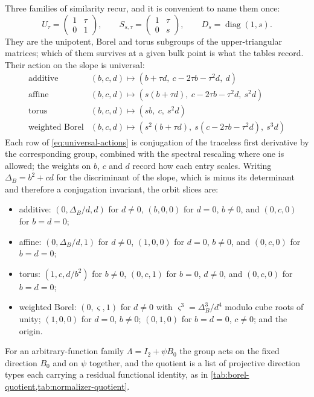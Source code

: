 \documentclass[11pt,reqno]{amsart}
\theoremstyle{plain}
\theoremstyle{definition}
\theoremstyle{remark}
\numberwithin{equation}{section}
\providecommand{\diag}{\operatorname{diag}}
\newcommand{\Id}{I_2}
\begin{document}
Three families of similarity recur, and it is convenient to name them once:
\begin{equation}
U_\tau=\begin{pmatrix}1&\tau\\0&1\end{pmatrix},\qquad
S_{s,\tau}=\begin{pmatrix}1&\tau\\0&s\end{pmatrix},\qquad
D_s=\diag(1,s).
\label{eq:quotient-groups}
\end{equation}
They are the unipotent, Borel and torus subgroups of the upper-triangular
matrices; which of them survives at a given bulk point is what the tables record.
Their action on the slope is universal:
\begin{equation}
\begin{array}{c|c}
\text{additive}&(b,c,d)\mapsto(b+\tau d,\ c-2\tau b-\tau^2d,\ d)\\[1mm]
\text{affine}&(b,c,d)\mapsto(s(b+\tau d),\ c-2\tau b-\tau^2d,\ s^2d)\\[1mm]
\text{torus}&(b,c,d)\mapsto(sb,\ c,\ s^2d)\\[1mm]
\text{weighted Borel}&(b,c,d)\mapsto
(s^2(b+\tau d),\ s(c-2\tau b-\tau^2d),\ s^3d)
\end{array}                                             \label{eq:universal-actions}
\end{equation}
Each row of \cref{eq:universal-actions} is conjugation of the traceless first
derivative by the corresponding group, combined with the spectral rescaling where
one is allowed; the weights on $b$, $c$ and $d$ record how each entry scales.
Writing $\Delta_B=b^2+cd$ for the discriminant of the slope, which is minus its
determinant and therefore a conjugation invariant, the orbit slices are:
\begin{itemize}
\item additive: $(0,\Delta_B/d,d)$ for $d\ne0$, $(b,0,0)$ for $d=0$, $b\ne0$,
and $(0,c,0)$ for $b=d=0$;
\item affine: $(0,\Delta_B/d,1)$ for $d\ne0$, $(1,0,0)$ for $d=0$, $b\ne0$, and
$(0,c,0)$ for $b=d=0$;
\item torus: $(1,c,d/b^2)$ for $b\ne0$, $(0,c,1)$ for $b=0$, $d\ne0$, and
$(0,c,0)$ for $b=d=0$;
\item weighted Borel: $(0,\varsigma,1)$ for $d\ne0$ with
$\varsigma^3=\Delta_B^3/d^4$ modulo cube roots of unity; $(1,0,0)$ for $d=0$,
$b\ne0$; $(0,1,0)$ for $b=d=0$, $c\ne0$; and the origin.
\end{itemize}
For an arbitrary-function family $\Lambda=\Id+\psi B_0$ the group acts on the
fixed direction $B_0$ and on $\psi$ together, and the quotient is a list of
projective direction types each carrying a residual functional identity, as in
\cref{tab:borel-quotient,tab:normalizer-quotient}.
\end{document}
